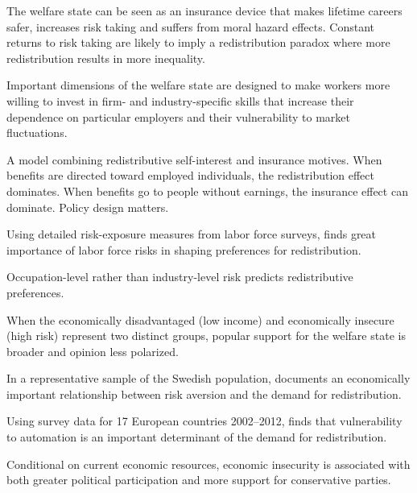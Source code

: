 \documentclass{article}
\newcommand{\citem}[1]{\medskip \noindent \textbf{\cite*{#1}}}
\begin{document}
\citem{sinn1995theory}

The welfare state can be seen as an insurance device that makes lifetime careers safer, increases risk taking and suffers from moral hazard effects. Constant returns to risk taking are likely to imply a redistribution paradox where more redistribution results in more inequality.

\citem{iversen2001asset}

Important dimensions of the welfare state are designed to make workers more willing to invest in firm- and industry-specific skills that increase their dependence on particular employers and their vulnerability to market fluctuations.

\citem{moene2001inequality}

A model combining redistributive self-interest and insurance motives. When benefits are directed toward employed individuals, the redistribution effect dominates. When benefits go to people without earnings, the insurance effect can dominate. Policy design matters.

\citem{cusack2006risks}

Using detailed risk-exposure measures from labor force surveys, finds great importance of labor force risks in shaping preferences for redistribution.

\citem{rehm2009risks}

Occupation-level rather than industry-level risk predicts redistributive preferences.

\citem{rehm2012insecure}

When the economically disadvantaged (low income) and economically insecure (high risk) represent two distinct groups, popular support for the welfare state is broader and opinion less polarized.

\citem{gartner2017individual}

In a representative sample of the Swedish population, documents an economically important relationship between risk aversion and the demand for redistribution.

\citem{thewissen2019automation}

Using survey data for 17 European countries 2002--2012, finds that vulnerability to automation is an important determinant of the demand for redistribution.

\citem{bossert2023economic}

Conditional on current economic resources, economic insecurity is associated with both
greater political participation and more support for conservative parties.
\end{document}
